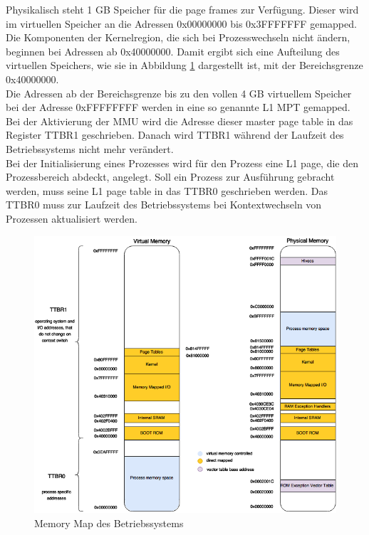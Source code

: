 Physikalisch steht 1 GB Speicher für die page frames zur Verfügung. Dieser wird im virtuellen Speicher an die Adressen 0x00000000 bis 0x3FFFFFFF gemapped. Die Komponenten der Kernelregion, die sich bei Prozesswechseln nicht ändern, beginnen bei Adressen ab 0x40000000. Damit ergibt sich eine Aufteilung des virtuellen Speichers, wie sie in Abbildung \ref{fig:MemoryMap} dargestellt ist, mit der Bereichsgrenze 0x40000000.\\

Die Adressen ab der Bereichsgrenze bis zu den vollen 4 GB virtuellem Speicher bei der Adresse 0xFFFFFFFF werden in eine so genannte L1 \ac{MPT} gemapped. Bei der Aktivierung der MMU wird die Adresse dieser master page table in das Register TTBR1 geschrieben. Danach wird TTBR1 während der Laufzeit des Betriebssystems nicht mehr verändert.\\

Bei der Initialisierung eines Prozesses wird für den Prozess eine L1 page, die den Prozessbereich abdeckt, angelegt. Soll ein Prozess zur Ausführung gebracht werden, muss seine L1 page table in das TTBR0 geschrieben werden. Das TTBR0 muss zur Laufzeit des Betriebssystems bei Kontextwechseln von Prozessen aktualisiert werden.\\


\begin{figure}[H]
	\includegraphics[scale=0.60]{chapters/mmu/figures/MemoryMap}
	\caption{Memory Map des Betriebssystems}
	\label{fig:MemoryMap}
\end{figure}




